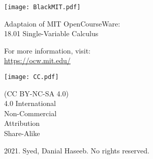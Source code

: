 \documentclass[./main.tex]{subfiles}
\begin{document}
\thispagestyle{empty}

\vspace*{\fill}%

\small
\texttt{[image: BlackMIT.pdf]}

Adaptaion of MIT OpenCourseWare:\\
18.01 Single-Variable Calculus

For more information, visit:\\
\url{https://ocw.mit.edu/}

\vspace*{1cm}

\texttt{[image: CC.pdf]}

(CC BY-NC-SA 4.0)\\
4.0 International\\
Non-Commercial\\
Attribution\\
Share-Alike

\vspace*{1cm}

2021.
Syed, Danial Haseeb.
No rights reserved.
\end{document}

